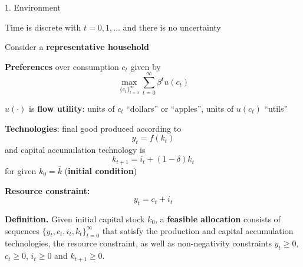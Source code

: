 \documentclass[11pt, aspectratio=169]{beamer}
\newenvironment{witemize}{\itemize\addtolength{\itemsep}{10pt}}{\enditemize}
\begin{document}
\begin{frame}{1. Environment}
\begin{witemize}
\item Time is discrete with $t = 0, 1, \ldots$ and there is no uncertainty

\item Consider a \textbf{representative household} 

\item \textbf{Preferences} over consumption $c_t$ given by
\begin{equation*}
	\max_{ \{ c_t \}_{t=0}^\infty } \sum_{t = 0}^\infty \beta^t u(c_t)
\end{equation*}

\item $u(\cdot)$ is \textbf{flow utility}: units of $c_t$ ``dollars'' or ``apples'', units of $u(c_t)$ ``utils''
\end{witemize}
\end{frame}




\begin{frame}{}
\begin{witemize}
\item \textbf{Technologies}: final good produced according to 
\begin{equation*}
	y_t = f(k_t)
\end{equation*}
and capital accumulation technology is 
\begin{equation*}
	k_{t+1} = i_t + (1 - \delta) k_t 
\end{equation*}
for given $k_0 = \bar k$ (\textbf{initial condition})

\item \textbf{Resource constraint:}
\begin{equation*}
	y_t = c_t + i_t
\end{equation*}
\end{witemize}

\vspace{4mm}
\textbf{Definition.} Given initial capital stock $k_0$, a \textbf{feasible allocation} consists of sequences $\{y_t, c_t, i_t, k_t\}_{t = 0}^\infty$ that satisfy the production and capital accumulation technologies, the resource constraint, as well as non-negativity constraints $y_t \geq 0$, $c_t \geq 0$, $i_t \geq 0$ and $k_{t+1} \geq 0$.

\end{frame}
\end{document}
